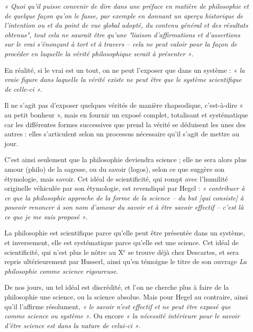 {\it « Quoi qu’il puisse convenir de dire dans une préface en matière de philosophie et de quelque façon qu’on le fasse, par exemple en donnant un aperçu historique de l’intention ou et du point de vue global adopté, du contenu général et des résultats obtenus", tout cela ne saurait être qu’une "liaison d’affirmations et d’assertions sur le vrai s’énonçant à tort et à travers – cela ne peut valoir pour la façon de procéder en laquelle la vérité philosophique serait à présenter »}.

En réalité, si le vrai est un tout, on ne peut l’exposer que dans un système : {\it « la vraie figure dans laquelle la vérité existe ne peut être que le système scientifique de celle-ci »}.

Il ne s’agit pas d’exposer quelques vérités de manière rhapsodique, c’est-à-dire « au petit bonheur », mais en fournir un exposé complet, totalisant et systématique car les différentes formes successives que prend la vérité se déduisent les unes des autres : elles s’articulent selon un processus nécessaire qu’il s’agit de mettre au jour.

C’est ainsi seulement que la philosophie deviendra science ; elle ne sera alors plus amour (philo) de la sagesse, ou du savoir (logos), selon ce que suggère son étymologie, mais savoir. Cet idéal de scientificité, qui rompt avec l’humilité originelle véhiculée par son étymologie, est revendiqué par Hegel : {\it « contribuer à ce que la philosophie approche de la forme de la science – du but [qui consiste] à pouvoir renoncer à son nom d’amour du savoir et à être savoir effectif – c’est là ce que je me suis proposé »}.

La philosophie est scientifique parce qu’elle peut être présentée dans un système, et inversement, elle est systématique parce qu’elle est une science. Cet idéal de scientificité, qui n’est plus le nôtre au
{\footnotesize X}$^\text{e}$
se trouve déjà chez Descartes, et sera repris ultérieurement par Husserl, ainsi qu’en témoigne le titre de son ouvrage {\it La philosophie comme science rigoureuse}.

De nos jours, un tel idéal est discrédité, et l’on ne cherche plus à faire de la philosophie une science, ou la science absolue. Mais pour Hegel au contraire, ainsi qu’il l’affirme résolument, {\it « le savoir n’est effectif et ne peut être exposé que comme science ou système »}. Ou encore {\it « la nécessité intérieure pour le savoir d’être science est dans la nature de celui-ci »}.

